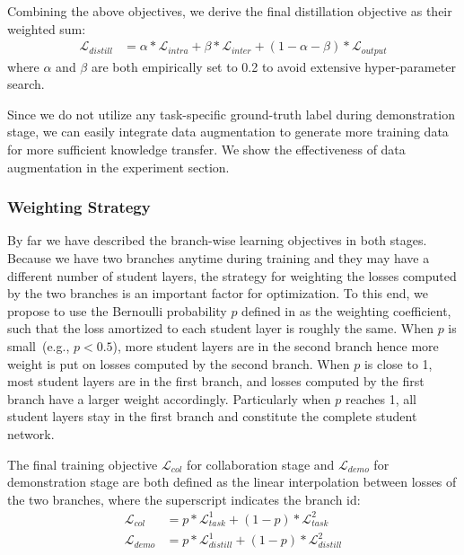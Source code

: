Combining the above objectives, we derive the final distillation objective as their weighted sum:
\begin{align}
    \mathcal{L}_{distill}&=\alpha*\mathcal{L}_{intra}+\beta*\mathcal{L}_{inter}+(1-\alpha-\beta)*\mathcal{L}_{output}
    \label{eq:distill}
\end{align}
where $\alpha$ and $\beta$ are both empirically set to 0.2 to avoid extensive hyper-parameter search.

Since we do not utilize any task-specific ground-truth label during demonstration stage, we can easily integrate data augmentation to generate more training data for more sufficient knowledge transfer. We show the 
effectiveness of data augmentation in the experiment section.
  
\subsubsection{Weighting Strategy}
\label{sec:weighting}
By far we have described the branch-wise learning objectives in both stages. Because we have two branches anytime during training and they may have a different number of student 
layers, the strategy for weighting the losses computed by the two branches is an important factor for optimization. To this end, we propose to use the Bernoulli probability $p$ defined in  as the weighting coefficient, such that the loss amortized to each student layer is roughly the same.  
When $p$ is small~(e.g., $p<0.5$), more student layers are in the second branch hence more weight is put on losses computed by the second branch. When $p$ is close to 1, most 
student layers are in the first branch, and losses computed by the first branch have a larger weight accordingly. Particularly when $p$ reaches 1, all student layers stay in the first branch 
and constitute the complete student network.

The final training objective $\mathcal{L}_{col}$ for collaboration stage and $\mathcal{L}_{demo}$ for demonstration stage are both defined as the linear interpolation between losses of the two branches, where the superscript indicates the branch id:
\begin{align}
    \mathcal{L}_{col} &= p * \mathcal{L}_{task}^1 + (1-p) * \mathcal{L}_{task}^2 \\
    \mathcal{L}_{demo} &= p * \mathcal{L}_{distill}^1 + (1-p) * \mathcal{L}_{distill}^2
\end{align}
